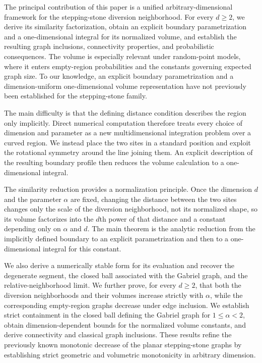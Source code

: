\documentclass[a4paper,fleqn]{cas-dc}
\theoremstyle{definition}
\theoremstyle{remark}
\newcommand{\0}{\mathbf{0}}
\begin{document}
The principal contribution of this paper is a unified arbitrary-dimensional
framework for the stepping-stone diversion neighborhood. For every
$d\geq2$, we derive its similarity factorization, obtain an explicit boundary
parametrization and a one-dimensional integral for its normalized volume,
and establish the resulting graph inclusions, connectivity properties,
and probabilistic consequences.
The volume is especially relevant under random-point models, where it enters
empty-region probabilities and the constants governing expected graph size.
To our knowledge, an explicit boundary parametrization and a
dimension-uniform one-dimensional volume representation have not previously
been established for the stepping-stone family.


The main difficulty is that the defining distance condition describes the
region only implicitly. Direct numerical computation therefore treats every
choice of dimension and parameter as a new multidimensional integration
problem over a curved region. We instead place the two sites in a standard
position and exploit the rotational symmetry around the line joining them.
An explicit description of the resulting boundary profile then reduces the
volume calculation to a one-dimensional integral.

The similarity reduction provides a normalization principle. Once the
dimension $d$ and the parameter $\alpha$ are fixed, changing the distance
between the two sites changes only the scale of the diversion neighborhood,
not its normalized shape, so its volume factorizes into the $d$th power of
that distance and a constant depending only on $\alpha$ and $d$. The main
theorem is the analytic reduction from the implicitly defined boundary to an
explicit parametrization and then to a one-dimensional integral for this
constant.

We also derive a numerically stable form for its evaluation and recover the
degenerate segment, the closed ball associated with the Gabriel graph, 
and the relative-neighborhood limit.
We further prove, for every $d\geq2$, that both the diversion neighborhoods
and their volumes increase strictly with $\alpha$, while the corresponding
empty-region graphs decrease under edge inclusion. We establish strict
containment in
the closed ball defining the Gabriel graph
for $1\leq\alpha<2$, obtain dimension-dependent bounds for the normalized
volume constants, and derive connectivity and classical graph inclusions.
These results refine the previously known monotonic decrease of the planar
stepping-stone graphs by establishing strict geometric and volumetric
monotonicity in arbitrary dimension.
\end{document}
